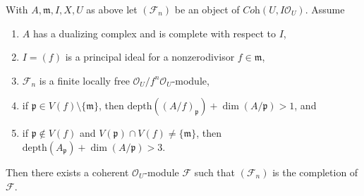 \begin{lemma}
\label{lemma-algebraization-principal}
With $A, \mathfrak m, I, X, U$ as above let
$(\mathcal{F}_n)$ be an object of $\textit{Coh}(U, I\mathcal{O}_U)$.
Assume
\begin{enumerate}
\item $A$ has a dualizing complex and is complete with respect to $I$,
\item $I = (f)$ is a principal ideal for a nonzerodivisor $f \in \mathfrak m$,
\item $\mathcal{F}_n$ is a finite locally free
$\mathcal{O}_U/f^n\mathcal{O}_U$-module,
\item if $\mathfrak p \in V(f) \setminus \{\mathfrak m\}$, then
$\text{depth}((A/f)_\mathfrak p) + \dim(A/\mathfrak p) > 1$, and
\item if $\mathfrak p \not \in V(f)$ and
$V(\mathfrak p) \cap V(f) \not = \{\mathfrak m\}$, then
$\text{depth}(A_\mathfrak p) + \dim(A/\mathfrak p) > 3$.
\end{enumerate}
Then there exists a coherent $\mathcal{O}_U$-module
$\mathcal{F}$ such that $(\mathcal{F}_n)$ is the completion of $\mathcal{F}$.
\end{lemma}

